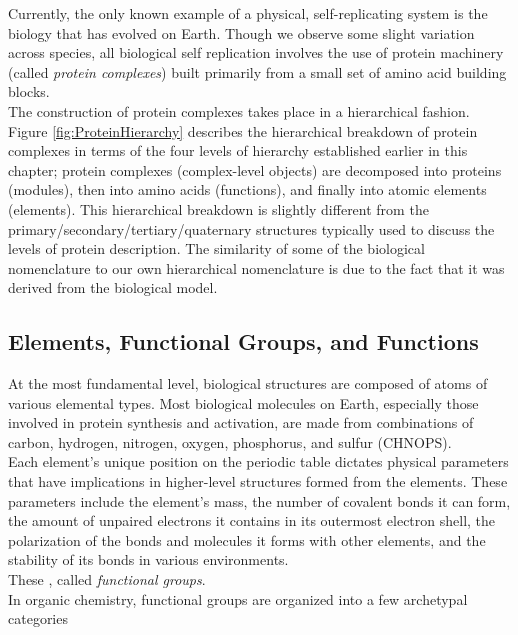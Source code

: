 {Currently, the only known example of a physical, self-replicating system is the biology that has evolved on Earth.  Though we observe some slight variation across species, all biological self replication involves the use of protein machinery (called \textit{protein complexes}) built primarily from a small set of amino acid building blocks.\\

The construction of protein complexes takes place in a hierarchical fashion.  Figure \ref{fig:ProteinHierarchy} describes the hierarchical breakdown of protein complexes in terms of the four levels of hierarchy established earlier in this chapter; protein complexes (complex-level objects) are decomposed into proteins (modules), then into amino acids (functions), and finally into atomic elements (elements).  This hierarchical breakdown is slightly different from the primary/secondary/tertiary/quaternary structures typically used to discuss the levels of protein description.  The similarity of some of the biological nomenclature to our own hierarchical nomenclature is due to the fact that it was derived from the biological model.

\subsection{Elements, Functional Groups, and Functions}

At the most fundamental level, biological structures are composed of atoms of various elemental types.  Most biological molecules on Earth, especially those involved in protein synthesis and activation, are made from combinations of carbon, hydrogen, nitrogen, oxygen, phosphorus, and sulfur (CHNOPS).\\

Each element's unique position on the periodic table dictates physical parameters that have implications in higher-level structures formed from the elements.  These parameters include the element's mass, the number of covalent bonds it can form, the amount of unpaired electrons it contains in its outermost electron shell, the polarization of the bonds and molecules it forms with other elements, and the stability of its bonds in various environments.\\

These , called \textit{functional groups}.\\



In organic chemistry, functional groups are organized into a few archetypal categories \\

}
